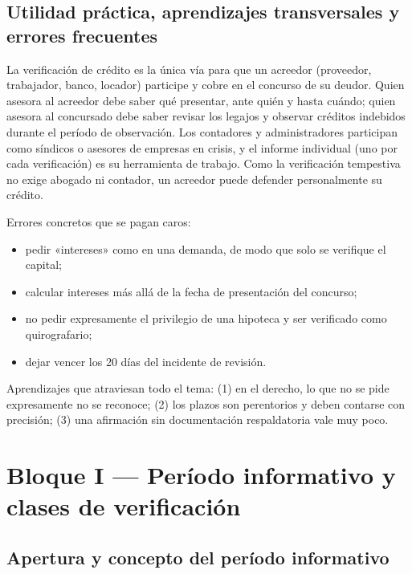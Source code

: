 \documentclass[12pt,oneside]{book}
\begin{document}
\section*{Utilidad práctica, aprendizajes transversales y errores frecuentes}

La verificación de crédito es la única vía para que un acreedor (proveedor, trabajador, banco, locador) participe y cobre en el concurso de su deudor. Quien asesora al acreedor debe saber qué presentar, ante quién y hasta cuándo; quien asesora al concursado debe saber revisar los legajos y observar créditos indebidos durante el período de observación. Los contadores y administradores participan como síndicos o asesores de empresas en crisis, y el informe individual (uno por cada verificación) es su herramienta de trabajo. Como la verificación tempestiva no exige abogado ni contador, un acreedor puede defender personalmente su crédito.

Errores concretos que se pagan caros:

\begin{itemize}
    \item pedir «intereses» como en una demanda, de modo que solo se verifique el capital;
    \item calcular intereses más allá de la fecha de presentación del concurso;
    \item no pedir expresamente el privilegio de una hipoteca y ser verificado como quirografario;
    \item dejar vencer los 20 días del incidente de revisión.
\end{itemize}

Aprendizajes que atraviesan todo el tema: (1) en el derecho, lo que no se pide expresamente no se reconoce; (2) los plazos son perentorios y deben contarse con precisión; (3) una afirmación sin documentación respaldatoria vale muy poco.

\chapter[Período informativo y verificación]{Bloque I — Período informativo y clases de verificación}

\section{Apertura y concepto del período informativo}
\end{document}
